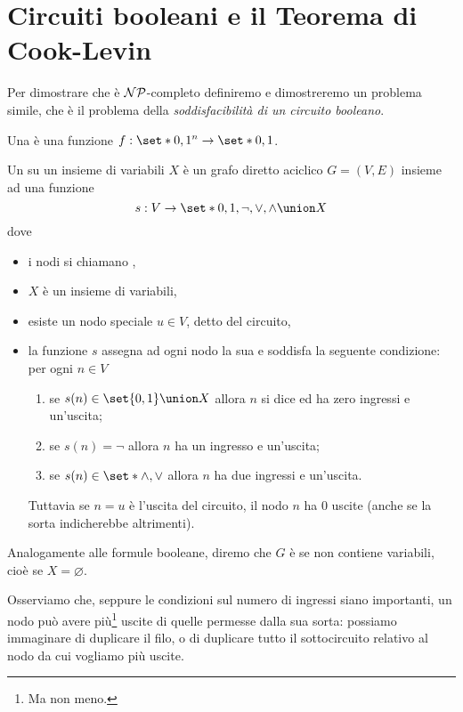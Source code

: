 \section{Circuiti booleani e il Teorema di Cook-Levin}

Per dimostrare che \SAT{} è $\mathcal{NP}$-completo definiremo e dimostreremo un problema
simile, che è il problema \CSAT{} della \emph{soddisfacibilità di un 
circuito booleano}.

\begin{definition}
  Una  è una funzione $f : \set*{0, 1}^n \to \set*{0, 1}$.
  
  Un  su un insieme di variabili $X$ 
  è un grafo diretto aciclico $G = (V, E)$ insieme ad una funzione \[
    s : V \to \set*{0, 1, {\neg}, {\lor}, {\land}} \union X
  \] dove
  \begin{itemize}
    \item i nodi si chiamano ,
    \item $X$ è un insieme di variabili,
    \item esiste un nodo speciale $u \in V$, detto  del circuito, 
    \item la funzione $s$ assegna ad ogni nodo la sua  e soddisfa
      la seguente condizione: per ogni $n \in V$ \begin{enumerate}[(1)]
        \item se $s(n) \in \set{0, 1} \union X$ allora $n$ si dice 
           ed ha zero ingressi e un'uscita;
        \item se $s(n) = {\neg}$ allora $n$ ha un ingresso e un'uscita;
        \item se $s(n) \in \set*{{\land}, {\lor}}$ allora $n$ ha due ingressi
          e un'uscita.
      \end{enumerate} Tuttavia se $n = u$ è l'uscita del circuito, il nodo $n$
      ha $0$ uscite (anche se la sorta indicherebbe altrimenti).
  \end{itemize}

  Analogamente alle formule booleane, diremo che $G$ è  se
  non contiene variabili, cioè se $X = \varnothing$. 
\end{definition}

Osserviamo che, seppure le condizioni sul numero di ingressi siano importanti,
un nodo può avere più\footnote{Ma non meno.} uscite di quelle permesse dalla sua
sorta: possiamo immaginare di duplicare il filo, o di duplicare tutto il 
sottocircuito relativo al nodo da cui vogliamo più uscite.

